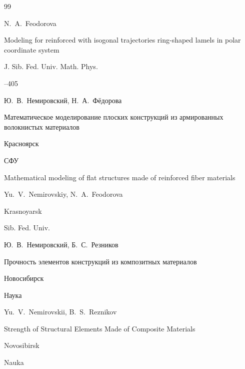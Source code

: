\begin{thebibliography}{99}

\misctransl

\by N.~A.~Feodorova

\paper Modeling for reinforced with isogonal trajectories ring-shaped lamels in polar coordinate system

\jour J. Sib. Fed. Univ. Math. Phys.




--405




\by Ю.~В.~Немировский, Н.~А.~Фёдорова

\book Математическое моделирование плоских конструкций из армированных волокнистых материалов

\publaddr Красноярск

\publ СФУ



\misctransl

\book Mathematical modeling of flat structures made of reinforced fiber materials

\by Yu.~V.~Nemirovskiy, N.~A.~Feodorova 

\publaddr Krasnoyarsk 

\publ Sib. Fed. Univ. 

 






\by Ю.~В.~Немировский, Б.~С.~Резников

\book Прочность элементов конструкций из композитных материалов

\publaddr Новосибирск

\publ Наука



\misctransl

\by Yu.~V.~Nemirovskii,  B.~S.~Reznikov

\book Strength of Structural Elements Made of Composite Materials 

\publaddr Novosibirsk 

\publ Nauka








\end{thebibliography}
